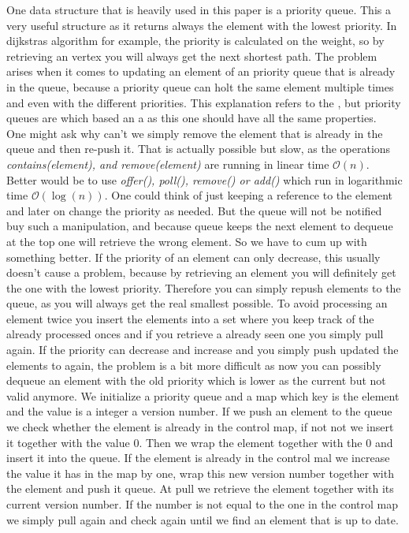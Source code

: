 One data structure that is heavily used in this paper is a priority queue. This a very useful structure as it returns always the element with the lowest priority. In dijkstras algorithm for example, the
priority is calculated on the weight, so by retrieving an vertex you will always get the next shortest path. 
The problem arises when it comes to updating an element of an priority queue that is already in the queue, because a priority queue can holt the same element multiple times and even with the different priorities. 
This explanation refers to the \cite[Java 17 reference]{JavaPrioQueue}, but priority queues are which based an a \cite[binary heap]{floyd1964algorithm} as this one should have all the same properties. \\
One might ask why can't we simply remove the element that is already in the queue and then re-push it. That is actually possible but slow, as the operations \textit{contains(element), and remove(element)} are running in linear time $\mathcal{O}(n) $. Better would be to use 
\textit{offer(), poll(), remove() or add()} which run in logarithmic time $\mathcal{O}( \log (n))$. 
One could think of just keeping a reference to the element and later on change the priority as needed. But the queue will not be notified buy such a manipulation, and because queue keeps the next element to dequeue at 
the top one will retrieve the wrong element. So we have to cum up with something better.
If the priority of an element can only decrease, this usually doesn't cause a problem, because by retrieving an element you will definitely get the one with the lowest priority. Therefore you can simply repush elements
to the queue, as you will always get the real smallest possible. To avoid processing an element twice you insert the elements into a set where you keep track of the already processed onces and if you retrieve a already seen
one you simply pull again. 
If the priority can decrease and increase and you simply push updated the elements to again, the problem is a bit more difficult as now you can possibly dequeue an element with the old priority which is lower as the current but not valid anymore.
We initialize a priority queue and a map which key is the element and the value is a integer a version number. If we push an element to the queue we check whether the element is already in the control map, if not not we insert it together with the value $0$. 
Then we wrap the element together with the $0$ and insert it into the queue. If the element is already in the control mal we increase the value it has in the map by one, wrap this new version number together with the element and push it queue. 
At pull we retrieve the element together with its current version number. If the number is not equal to the one in the control map we simply pull again and check again until we find an element that is up to date.


